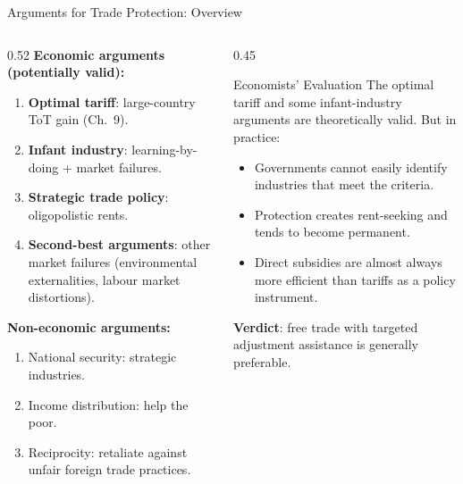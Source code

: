 \documentclass[aspectratio=169]{beamer}
\begin{document}
\begin{frame}{Arguments for Trade Protection: Overview}
\begin{columns}
\begin{column}{0.52\textwidth}
\textbf{Economic arguments (potentially valid):}
\begin{enumerate}
  \item \textbf{Optimal tariff}: large-country ToT gain (Ch.~9).
  \item \textbf{Infant industry}: learning-by-doing + market failures.
  \item \textbf{Strategic trade policy}: oligopolistic rents.
  \item \textbf{Second-best arguments}: other market failures (environmental externalities, labour market distortions).
\end{enumerate}
\vspace{0.3em}
\textbf{Non-economic arguments:}
\begin{enumerate}
  \item National security: strategic industries.
  \item Income distribution: help the poor.
  \item Reciprocity: retaliate against unfair foreign trade practices.
\end{enumerate}
\end{column}
\begin{column}{0.45\textwidth}
\begin{insight}{Economists' Evaluation}
  The optimal tariff and some infant-industry arguments are theoretically valid. But in practice:
  \begin{itemize}\small
    \item Governments cannot easily identify industries that meet the criteria.
    \item Protection creates rent-seeking and tends to become permanent.
    \item Direct subsidies are almost always more efficient than tariffs as a policy instrument.
  \end{itemize}
  \textbf{Verdict}: free trade with targeted adjustment assistance is generally preferable.
\end{insight}
\end{column}
\end{columns}
\end{frame}
\end{document}
